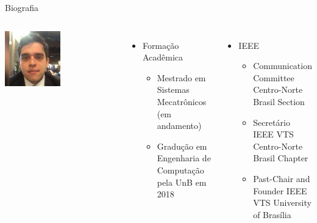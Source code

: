 

  
 
 


\justify
 \maketitle


\begin {frame}[shrink=30]{Biografia}
\small
\begin{columns}[c]
\centering
\includegraphics[width=0.5\textwidth]{Bruno}
\centering
\begin{itemize}
  \item Formação Acadêmica
  \begin{itemize}
    \item Mestrado em Sistemas Mecatrônicos (em andamento)
    \item Gradução em Engenharia de Computação pela UnB em 2018
  \end{itemize}
\end{itemize}

\begin{itemize}
  \item IEEE
  \begin{itemize}
    \item Communication Committee Centro-Norte Brasil Section
    \item Secretário IEEE VTS Centro-Norte Brasil Chapter
    \item Past-Chair and Founder IEEE VTS University of Brasília
  \end{itemize}
\end{itemize}


\end{columns}
\end{frame}
